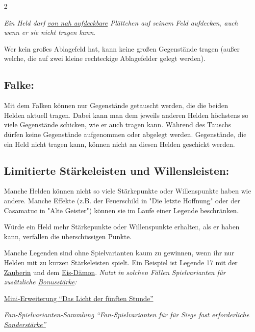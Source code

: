 \documentclass[10pt, a4paper, oneside]{book}
\newcommand{\fan}[1]{\textit{#1}}
\begin{document}
\begin{multicols*}{2}
\begin{nobgcolor}
\fan{Ein Held darf \hyperref[Aufdecken]{von nah aufdeckbare} Plättchen auf seinem Feld aufdecken, auch wenn er sie nicht tragen kann.}

Wer kein großes Ablagefeld hat, kann keine großen Gegenstände tragen (außer welche, die auf zwei kleine rechteckige Ablagefelder gelegt werden\supercite{DRidN:Begleitheft}).


\subsection{Falke:}

Mit dem Falken können nur Gegenstände getauscht werden, die die beiden Helden aktuell tragen. Dabei kann man dem jeweils anderen Helden höchstens so viele Gegenstände schicken, wie er auch tragen kann. Während des Tauschs dürfen keine Gegenstände aufgenommen oder abgelegt werden. Gegenstände, die ein Held nicht tragen kann, können nicht an diesen Helden geschickt werden. 
\supercite{1673}







\subsection{Limitierte Stärkeleisten und Willensleisten:}

Manche Helden können nicht so viele Stärkepunkte oder Willenspunkte haben wie andere. Manche Effekte (z.B. der Feuerschild in "Die letzte Hoffnung" oder der Casamatuc in "Alte Geister") können sie im Laufe einer Legende beschränken.

Würde ein Held mehr Stärkepunkte oder Willenspunkte erhalten, als er haben kann, verfallen die überschüssigen Punkte. 

Manche Legenden sind ohne Spielvarianten kaum zu gewinnen, wenn ihr nur Helden mit zu kurzen Stärkeleisten spielt. Ein Beispiel ist Legende 17 mit der \hyperref[Zauberin]{Zauberin} und dem \hyperref[Eis-Dämon]{Eis-Dämon}. \fan{Nutzt in solchen Fällen Spielvarianten für zusätzliche \hyperref[Bonusstärke]{Bonusstärke}:}

\href{https://legenden-von-andor.de/mini-erweiterung-das-licht-der-fuenften-stunde/}
{\blacktriangleright Mini-Erweiterung \enquote{Das Licht der fünften Stunde}}

\href{https://legenden-von-andor.de/forum/viewtopic.php?p=129669#p129669}
{\blacktriangleright \fan{Fan-Spielvarianten-Sammlung \enquote{Fan-Spielvarianten für für Siege fast erforderliche Sonderstärke}}}





\end{nobgcolor}
\end{multicols*}
\end{document}

